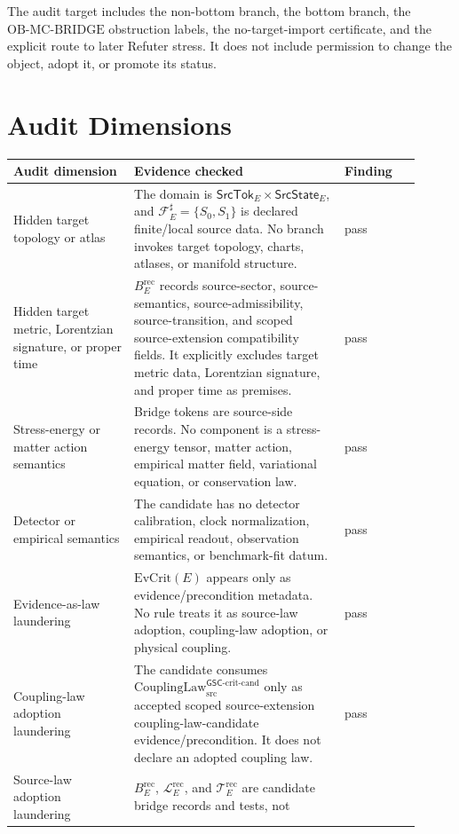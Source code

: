 \documentclass[11pt]{article}
\newcommand{\CouplingLawCrit}{\mathrm{CouplingLaw}^{\mathsf{GSC}\mbox{-}\mathrm{crit}\mbox{-}\mathrm{cand}}_{\mathrm{src}}}
\newcommand{\EvCrit}{\mathrm{EvCrit}}
\newcommand{\OBMCB}{\mathrm{OB}\mbox{-}\mathrm{MC}\mbox{-}\mathrm{BRIDGE}}
\newcommand{\BErec}{B_E^{\mathrm{rec}}}
\begin{document}
The audit target includes the non-bottom branch, the bottom branch, the
\(\OBMCB\) obstruction labels, the no-target-import certificate, and the
explicit route to later Refuter stress. It does not include permission to
change the object, adopt it, or promote its status.

\section{Audit Dimensions}

\begin{longtable}{p{0.27\linewidth}p{0.47\linewidth}p{0.17\linewidth}}
\toprule
Audit dimension & Evidence checked & Finding \\
\midrule
Hidden target topology or atlas &
The domain is \(\mathsf{SrcTok}_E\times\mathsf{SrcState}_E\), and
\(\mathcal{F}_E^\sharp=\{S_0,S_1\}\) is declared finite/local source data. No
branch invokes target topology, charts, atlases, or manifold structure. & pass \\
\addlinespace
Hidden target metric, Lorentzian signature, or proper time &
\(\BErec\) records source-sector, source-semantics, source-admissibility,
source-transition, and scoped source-extension compatibility fields. It
explicitly excludes target metric data, Lorentzian signature, and proper time
as premises. & pass \\
\addlinespace
Stress-energy or matter action semantics &
Bridge tokens are source-side records. No component is a stress-energy tensor,
matter action, empirical matter field, variational equation, or conservation
law. & pass \\
\addlinespace
Detector or empirical semantics &
The candidate has no detector calibration, clock normalization, empirical
readout, observation semantics, or benchmark-fit datum. & pass \\
\addlinespace
Evidence-as-law laundering &
\(\EvCrit(E)\) appears only as evidence/precondition metadata. No rule treats
it as source-law adoption, coupling-law adoption, or physical coupling. & pass \\
\addlinespace
Coupling-law adoption laundering &
The candidate consumes \(\CouplingLawCrit\) only as accepted scoped
source-extension coupling-law-candidate evidence/precondition. It does not
declare an adopted coupling law. & pass \\
\addlinespace
Source-law adoption laundering &
\(\BErec\), \(\mathcal{L}_E^{\mathrm{rec}}\), and
\(\mathcal{T}_E^{\mathrm{rec}}\) are candidate bridge records and tests, not

\end{longtable}
\end{document}
